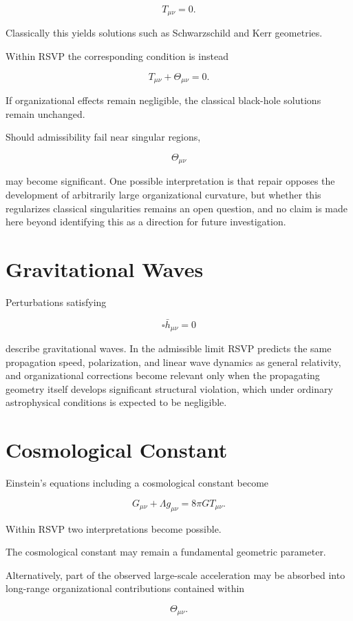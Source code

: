 \documentclass[11pt,oneside]{book}
\numberwithin{equation}{chapter}
\theoremstyle{definition}
\theoremstyle{plain}
\begin{document}
\[
T_{\mu\nu}=0.
\]

Classically this yields solutions such as Schwarzschild and Kerr geometries.

Within RSVP the corresponding condition is instead

\[
T_{\mu\nu}
+
\Theta_{\mu\nu}
=
0.
\]

If organizational effects remain negligible, the classical black-hole
solutions remain unchanged.

Should admissibility fail near singular regions,

\[
\Theta_{\mu\nu}
\]

may become significant. One possible interpretation is that repair opposes the development of arbitrarily large organizational curvature, but whether this regularizes classical singularities remains an open question, and no claim is made here beyond identifying this as a direction for future investigation.

\section{Gravitational Waves}

Perturbations satisfying

\[
\square
\bar h_{\mu\nu}
=
0
\]

describe gravitational waves. In the admissible limit RSVP predicts the same propagation speed, polarization, and linear wave dynamics as general relativity, and organizational corrections become relevant only when the propagating geometry itself develops significant structural violation, which under ordinary astrophysical conditions is expected to be negligible.

\section{Cosmological Constant}

Einstein's equations including a cosmological constant become

\[
G_{\mu\nu}
+
\Lambda
g_{\mu\nu}
=
8\pi G
T_{\mu\nu}.
\]

Within RSVP two interpretations become possible.

The cosmological constant may remain a fundamental geometric parameter.

Alternatively, part of the observed large-scale acceleration may be absorbed
into long-range organizational contributions contained within

\[
\Theta_{\mu\nu}.
\]
\end{document}
